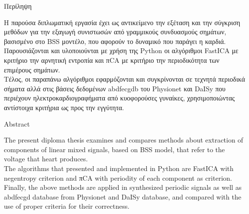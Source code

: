\pagestyle{plain}
\begin{center}
{\LARGE Περίληψη}\\[1cm]
\end{center}
Η παρούσα διπλωματική εργασία έχει ως αντικείμενο την εξέταση και την σύγκριση μεθόδων για την εξαγωγή συνιστωσών από γραμμικούς συνδυασμούς σημάτων, βασισμένο στο \en BSS \gr μοντέλο, που αφορούν το δυναμικό που παράγει η καρδιά.
\\
Παρουσιάζονται και υλοποιούνται με χρήση της \en Python \gr οι αλγόριθμοι \en FastICA \gr με κριτήριο την αρνητική εντροπία και π\en CA \gr με κριτήριο την περιοδικότητα των επιμέρους σημάτων.
\\
Τέλος, οι παραπάνω αλγόριθμοι εφαρμόζονται και συγκρίνονται σε τεχνητά περιοδικά σήματα αλλά στις βάσεις δεδομένων \en abdfecgdb \gr του \en Physionet \gr και \en DaISy \gr που περιέχουν ηλεκτροκαρδιογραφήματα από κυοφορούσες γυναίκες, χρησιμοποιώντας αντίστοιχα κριτήρια ως προς την εγγύτητα.

\blankpage

\pagestyle{plain}
\begin{center}
\en
{\LARGE Abstract}\\[1cm]
\end{center}
\en
The present diploma thesis examines and compares methods about extraction of components of linear mixed signals, based on BSS model, that refer to the voltage that heart produces.
\\
The algorithms that presented and implemented in Python are FastICA with negentropy criterion and \gr π\en CA with periodity of each component as criterion.
\\
Finally, the above methods are applied in synthesized periodic signals as well as abdfecgd database from Physionet and DaISy database, and compared with the use of proper criteria for their correctness.



